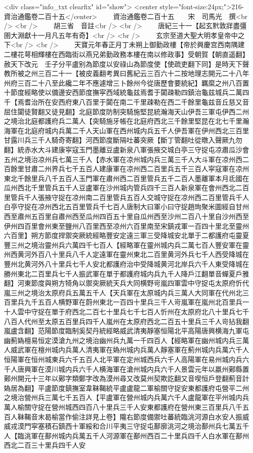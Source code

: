<div class="info_txt clearfix" id="show">
<center style="font-size:24px;">216-資治通鑑卷二百十五</center>
  　　資治通鑑卷二百十五　　宋　司馬光　撰<br />
<br />
　　胡三省　音註<br />
<br />
　　唐紀三十一【起玄黓敦牂盡彊圉大淵獻十一月凡五年有奇】<br />
<br />
　　玄宗至道大聖大明孝皇帝中之下<br />
<br />
　　天寶元年春正月丁未朔上御勤政樓【帝於興慶宫西南隅建二樓花萼相輝樓在西臨街以燕兄弟勤政務本樓在南以修政事】受朝賀【朝直遥翻】赦天下改元　壬子分平盧别為節度以安祿山為節度使【使疏吏翻下同】是時天下聲教所被之州三百二十一【被皮義翻考異曰舊紀云三百六十二按地理志開元二十八年州府三百二十八至此纔二年不應遽增三卜餘州今從唐歷會要統紀】羈縻之州八百置十節度經略使以備邊安西節度撫寜西域統龜兹焉耆于闐疎勒四鎮治龜兹城兵二萬四千【焉耆治所在安西府東八百里于闐在南二千里疎勒在西二千餘里龜兹音丘慈又音屈住闐徒賢翻又徒見翻】北庭節度防制突騎施堅昆統瀚海天山伊吾三軍屯伊西二州之境治北庭都護府兵二萬人【突騎施牙帳在北庭府西北三千餘里堅昆在北七千里瀚海軍在北庭府城内兵萬二千人天山軍在西州城内兵五千人伊吾軍在伊州西北三百里甘露川兵三千人騎奇寄翻】河西節度斷隔吐蕃突厥【斷丁管翻吐從暾入聲厥九勿翻】統赤水大斗建康寜寇玉門墨離豆盧新泉八軍張掖交城白亭三守捉屯凉肅瓜沙會五州之境治凉州兵七萬三千人【赤水軍在凉州城内兵三萬三千人大斗軍在凉州西二百餘里甘肅二州界兵七千五百人建康軍在凉州西二百里兵五千三百人寜寇軍在凉州東北千餘里兵八千五百人玉門軍在肅州西二百里管兵五千二百人墨離軍本月氐國在瓜州西北千里管兵五千人豆盧軍在沙州城内管兵四千三百人新泉軍在會州西北二百里管兵千人張掖守捉在凉州南二百里管兵五百人交城守捉在凉州西二百里管兵千人白亭守捉在凉州西北五百里管兵千七百人唐制大曰軍小曰守捉趙珣聚米圖經自甘州西至肅州五百里自肅州西至瓜州四百五十里自瓜州西至沙州二百八十里自沙州西至伊州四百里會州東至鹽州八百里西至凉州六百里南至宋鎮戎軍一百四十里北至靈州六百里】朔方節度捍禦突厥統經略豐安定遠三軍三受降城安北單于二都護府屯靈夏豐三州之境治靈州兵六萬四千七百人【經略軍在靈州城内兵二萬七百人豐安軍在靈州西黄河外百八十里兵八千人定遠軍在靈州東北二百里黄河外兵七千人西受降城在豐州北黄河外八十里兵七千人安北都護府治中受降城黄河北岸兵六千人東受降城在勝州東北二百里兵七千人振武軍在單于都護府城内兵九千人降戶江翻單音蟬夏戶雅翻】河東節度與朔方犄角以禦突厥統天兵大同横野岢嵐四軍雲中守捉屯太原府忻代嵐三州之境治太原府兵五萬五千人【天兵軍在太原城内兵三萬人大同軍在代州北三百里兵九千五百人横野軍在蔚州東北一百四十里兵三千人岢嵐軍在嵐州北百里兵一十人雲中守捉在單于府西北二百七十里兵七千七百人忻州在太原府北八十里兵七千八百人代州至太原五百里兵四千人嵐州在太原府西北二百五十里兵三千人岢拈我翻嵐盧含翻】范陽節度臨制奚契丹統經略威武清夷靜塞恒陽北平高陽唐興横海九軍屯幽薊媯檀易恒定漠滄九州之境治幽州兵九萬一千四百人【經略軍在幽州城内兵三萬人威武軍在檀州城内兵萬人清夷軍在媯州城内兵萬人靜塞軍在薊州城内兵萬六千人恒陽軍在恒州城東兵六千五百人北平軍在定州城西兵六千人高陽軍在易州城内兵六千人唐興軍在漠川城内兵六千人横海軍在滄州城内兵六千人景雲元年以嬴州鄚縣置鄚州開元十三年以鄚字類鄭字改為漠州尋又改莫州契欺訖翻又音喫恒戶登翻薊音計媯居為翻】平盧節度鎮撫室韋靺鞨統平盧盧龍二軍榆關守捉安東都護府屯營平二州之境治營州兵三萬七千五百人【平盧軍在營州城内兵萬六千人盧龍軍在平州城内兵萬人榆關守捉在營州城西四百八十里兵三千人安東都護府在營州東三百里兵八千五百人靺鞨音末曷榆當作偷注詳見上卷】隴右節度備禦吐蕃統臨洮河源白水安人振威威戎漠門寜塞積石鎮西十軍綏和合川平夷三守捉屯鄯廓洮河之境治鄯州兵七萬五千人【臨洮軍在鄯州城内兵萬五千人河源軍在鄯州西百二十里兵四千人白水軍在鄯州西北二百三十里兵四千人安